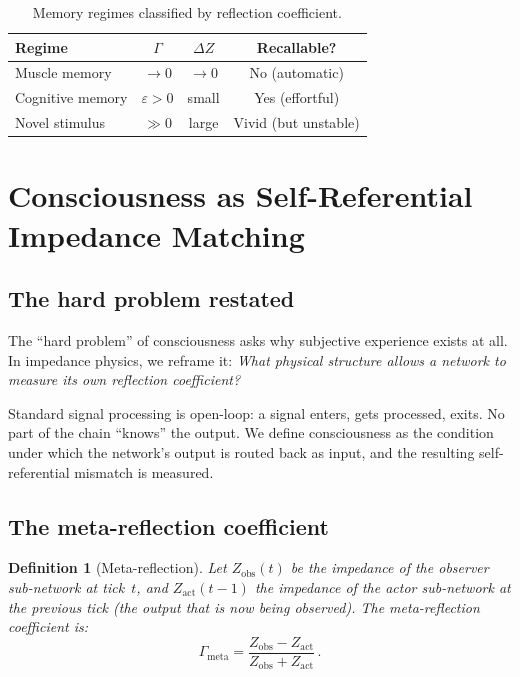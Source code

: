 \documentclass[aps,pre,twocolumn,superscriptaddress,floatfix]{revtex4-2}
\newtheorem{definition}{Definition}
\newcommand{\Gmeta}{\Gamma_{\text{meta}}}
\begin{document}
\begin{table}[h]
\centering
\caption{Memory regimes classified by reflection coefficient.}
\label{tab:memory-regimes}
\begin{tabular}{@{}lccc@{}}
\toprule
Regime & $\Gamma$ & $\Delta Z$ & Recallable? \\
\midrule
Muscle memory & $\to 0$ & $\to 0$ & No (automatic) \\
Cognitive memory & $\varepsilon>0$ & small & Yes (effortful) \\
Novel stimulus & $\gg 0$ & large & Vivid (but unstable) \\
\bottomrule
\end{tabular}
\end{table}


\section{Consciousness as Self-Referential Impedance Matching}
\label{sec:consciousness}

\subsection{The hard problem restated}

The ``hard problem'' of consciousness asks why subjective
experience exists at all.  In impedance physics, we reframe
it: \emph{What physical structure allows a network to measure
its own reflection coefficient?}

Standard signal processing is open-loop: a signal enters,
gets processed, exits.  No part of the chain ``knows'' the
output.  We define consciousness as the condition under which
the network's output is routed back as input, and the
resulting self-referential mismatch is measured.

\subsection{The meta-reflection coefficient}

\begin{definition}[Meta-reflection]
Let $Z_{\text{obs}}(t)$ be the impedance of the observer
sub-network at tick~$t$, and $Z_{\text{act}}(t-1)$ the
impedance of the actor sub-network at the previous tick
(the output that is now being observed).  The
\emph{meta-reflection coefficient} is:
\begin{equation}
  \Gmeta = \frac{Z_{\text{obs}} - Z_{\text{act}}}
                 {Z_{\text{obs}} + Z_{\text{act}}}\,.
  \label{eq:Gamma-meta}
\end{equation}
\end{definition}
\end{document}
